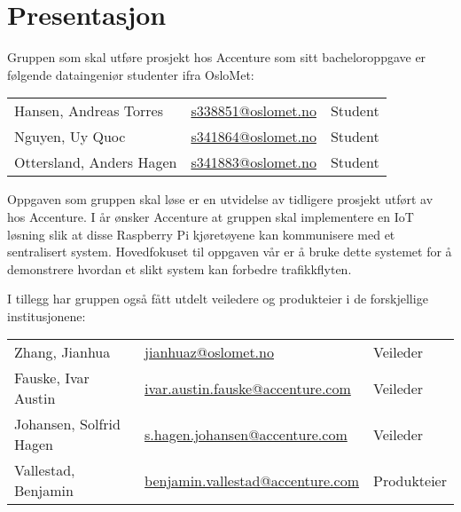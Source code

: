 \chapter{Presentasjon}
Gruppen som skal utføre prosjekt hos Accenture som sitt bacheloroppgave er følgende dataingeniør studenter ifra OsloMet:

\begin{tabular}{lcc}
	Hansen, Andreas Torres & \href{mailto:s338851@oslomet.no}{s338851@oslomet.no} & Student \\
	Nguyen, Uy Quoc & \href{mailto:ss341864@oslomet.no}{s341864@oslomet.no} & Student\\
	Ottersland, Anders Hagen & \href{mailto:s341883@oslomet.no}{s341883@oslomet.no} & Student
\end{tabular}

Oppgaven som gruppen skal løse er en utvidelse av tidligere prosjekt utført av \cite{bachelor2020} hos Accenture. I år ønsker Accenture at gruppen skal implementere en IoT løsning slik at disse Raspberry Pi kjøretøyene kan kommunisere med et sentralisert system. Hovedfokuset til oppgaven vår er å bruke dette systemet for å demonstrere hvordan et slikt system kan forbedre trafikkflyten.

I tillegg har gruppen også fått utdelt veiledere og produkteier i de forskjellige institusjonene:

\begin{tabular}{lll}
	Zhang, Jianhua & \href{mailto:jianhuaz@oslomet.no}{jianhuaz@oslomet.no} & Veileder \\
	Fauske, Ivar Austin & \href{mailto:ivar.austin.fauske@accenture.com}{ivar.austin.fauske@accenture.com} & Veileder \\
	Johansen, Solfrid Hagen & \href{mailto:s.hagen.johansen@accenture.com}{s.hagen.johansen@accenture.com} & Veileder\\
	Vallestad, Benjamin & \href{mailto:benjamin.vallestad@accenture.com}{benjamin.vallestad@accenture.com} & Produkteier
\end{tabular}


